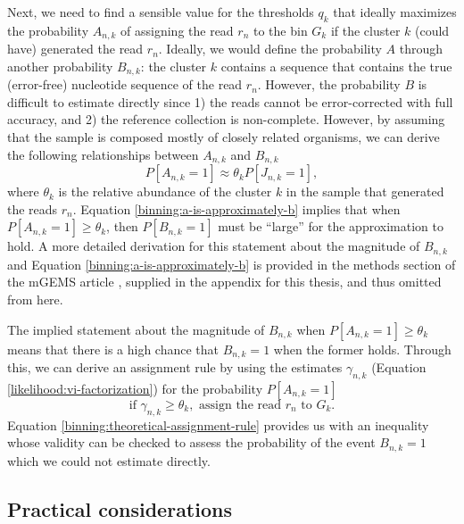 \documentclass[officiallayout]{tktla}
\begin{document}
Next, we need to find a sensible value for the thresholds $q_{k}$ that
ideally maximizes the probability $A_{n, k}$ of assigning the read
$r_{n}$ to the bin $G_{k}$ if the cluster $k$ (could have) generated
the read $r_{n}$. Ideally, we would define the probability $A$ through
another probability $B_{n, k}$: the cluster $k$ contains a sequence
that contains the true (error-free) nucleotide sequence of the read
$r_{n}$. However, the probability $B$ is difficult to estimate
directly since 1) the reads cannot be error-corrected with full
accuracy, and 2) the reference collection is non-complete. However, by
assuming that the sample is composed mostly of closely related
organisms, we can derive the following relationships between $A_{n,
  k}$ and $B_{n, k}$
\begin{equation}
  \label{binning:a-is-approximately-b}
  P\left[A_{n, k} = 1\right] \approx \theta_{k}P\left[J_{n, k} = 1\right],
\end{equation}
where $\theta_k$ is the relative abundance of the cluster $k$ in the
sample that generated the reads $r_{n}$. Equation
\ref{binning:a-is-approximately-b} implies that when $P\left[A_{n, k}
  = 1\right] \geq \theta_{k}$, then $P\left[B_{n, k} = 1\right]$ must
be ``large'' for the approximation to hold. A more detailed derivation
for this statement about the magnitude of $B_{n, k}$ and Equation
\ref{binning:a-is-approximately-b} is provided in the methods section
of the mGEMS article \cite{maklin_bacterial_2021}, supplied in the
appendix for this thesis, and thus omitted from here.

The implied statement about the magnitude of $B_{n, k}$ when
$P\left[A_{n, k} = 1\right] \geq \theta_{k}$ means that there is a
high chance that $B_{n, k} = 1$ when the former holds. Through this,
we can derive an assignment rule by using the estimates $\gamma_{n,
  k}$ (Equation \ref{likelihood:vi-factorization}) for the probability
$P\left[A_{n, k} = 1\right]$
\begin{equation}
  \label{binning:theoretical-assignment-rule}
  \text{if } \gamma_{n, k} \geq \theta_{k}, \text{ assign the read } r_{n} \text{ to } G_{k}.
\end{equation}
Equation \ref{binning:theoretical-assignment-rule} provides us with an
inequality whose validity can be checked to assess the probability of
the event $B_{n, k} = 1$ which we could not estimate directly.

\subsection{Practical considerations}
\end{document}
